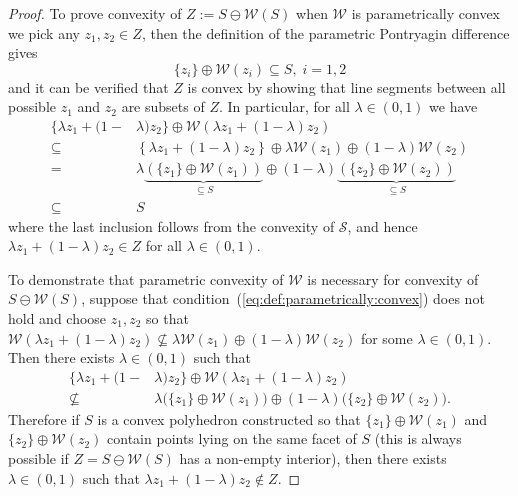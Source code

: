 \documentclass[journal]{IEEEtran}
\newcounter{thmcount}
\newtheorem{thm}[thmcount]{Theorem}
\theoremstyle{remark}
\theoremstyle{definition}
\begin{document}
%
\begin{proof}
To prove convexity of $Z :=  S\ominus \mathcal W( S)$ when $\mathcal W$ is parametrically convex we pick any $z_1,z_2\in Z$, then
the definition of the parametric Pontryagin difference gives
\begin{equation}
  \{z_i\} \oplus \mathcal W(z_i) \subseteq S,\; i=1,2 
\end{equation}
%
and it can be verified that $ Z$ is convex by showing that line segments between all possible $z_1$ and $z_2$ are subsets of $Z$. In particular, for all $\lambda \in (0,1)$ we have
\begin{align*}
  \{ \lambda z_1 + (1-&\lambda)z_2
  \}\oplus \mathcal W\left( \lambda z_1 + (1-\lambda)z_2\right)\\
  \subseteq&\left\{ \lambda z_1 + (1-\lambda)z_2
  \right\}\oplus \lambda \mathcal W(z_1) \oplus (1-\lambda)
  \mathcal W(z_2)\\
 = &\lambda\underbrace{(\{z_1\}\oplus \mathcal W(z_1))}_{\subseteq S}\oplus
  (1-\lambda)\underbrace{(\{z_2\}\oplus \mathcal W(z_2))}_{\subseteq S}\\
  \subseteq& S
\end{align*}
%
where the last inclusion follows from the convexity of $\mathcal S$, and hence 
$\lambda z_1 + (1-\lambda) z_2 \in Z$ for all $\lambda \in (0,1)$. 
%

To demonstrate that parametric convexity of $\mathcal W$ is necessary for convexity of $S\ominus \mathcal W(S)$, suppose that condition~(\ref{eq:def:parametrically:convex}) does not hold and choose $z_1,z_2$ so that $\mathcal W(\lambda z_1 + (1-\lambda) z_2) \not\subseteq \lambda \mathcal W(z_1) \oplus (1-\lambda) \mathcal W (z_2)$ for some $\lambda \in (0,1)$. Then there exists $\lambda\in(0,1)$ such that
\begin{align*}
  \{ \lambda z_1 + (1-&\lambda)z_2
  \}\oplus \mathcal W\left( \lambda z_1 + (1-\lambda)z_2\right)\\
 \not\subseteq &\lambda\bigl(\{z_1\}\oplus \mathcal W(z_1)\bigr)\oplus
  (1-\lambda)\bigl(\{z_2\}\oplus \mathcal W(z_2)\bigr) .
\end{align*}
Therefore if $S$ is a convex polyhedron constructed so that $\{z_1\}\oplus\mathcal W(z_1)$ and $\{z_2\}\oplus\mathcal W(z_2)$ contain points lying on the same facet of $S$ (this is always possible if $Z=S\ominus \mathcal W(S)$ has a non-empty interior), then there exists $\lambda \in (0,1)$ such that $\lambda z_1 + (1-\lambda) z_2 \notin Z$.
\end{proof}
\end{document}
